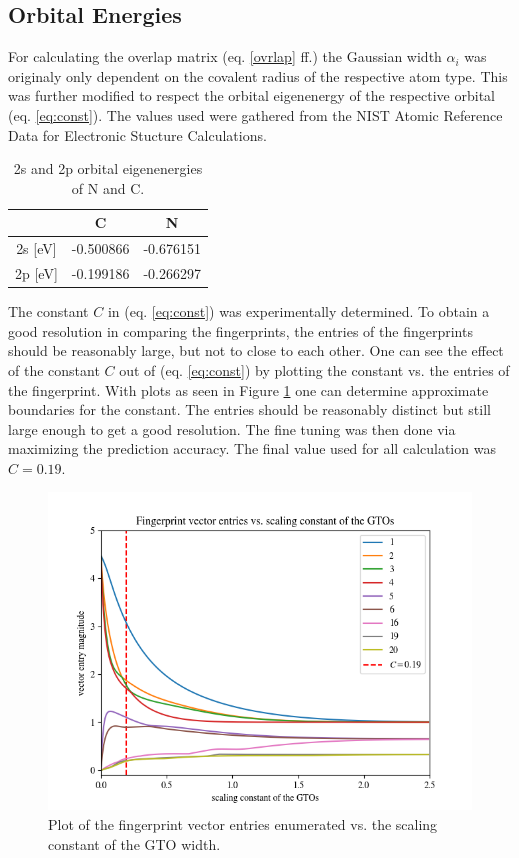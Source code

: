 \subsection{Orbital Energies}
For calculating the overlap matrix (eq. \ref{ovrlap} ff.) the Gaussian width $\alpha_i$ was originaly only dependent on the covalent radius of the respective atom type. This was further modified to respect the orbital eigenenergy of the respective orbital (eq. \ref{eq:const}). The values used were gathered from the NIST Atomic Reference Data for Electronic Stucture Calculations.

\begin{table}[h!]
\center
\label{table:energies}
\begin{tabular}{c|c|c}
            & \textbf{C} & \textbf{N} \\ \hline
2s {[}eV{]} & -0.500866  & -0.676151  \\ \hline
2p {[}eV{]} & -0.199186  & -0.266297 
\end{tabular}
\caption{2s and 2p orbital eigenenergies of N and C.}
\end{table}

The constant $C$ in (eq. \ref{eq:const}) was experimentally determined. To obtain a good resolution in comparing the fingerprints, the entries of the fingerprints should be reasonably large, but not to close to each other. One can see the effect of the constant $C$ out of (eq. \ref{eq:const}) by plotting the constant vs. the entries of the fingerprint.
With plots as seen in Figure \ref{fig:const} one can determine approximate boundaries for the constant. The entries should be reasonably distinct but still large enough to get a good resolution. The fine tuning was then done via maximizing the prediction accuracy. The final value used for all calculation was $C=0.19$.


\begin{figure}[h]

\includegraphics[width=\linewidth]{Figures/fpentry.png}
\caption{Plot of the fingerprint vector entries enumerated vs. the scaling constant of the GTO width.}
\label{fig:const} 
\end{figure}

